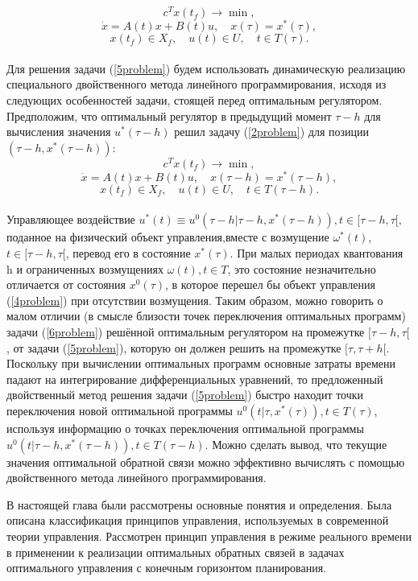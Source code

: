 \begin{equation} \label{5problem}
    c^Tx(t_f)\to \min,
    \end{equation}
$$
    \dot{x}=A(t)x+B(t)u,\quad x(\tau) = x^*(\tau),
    $$
$$
    x(t_f) \in X_f,\quad  u(t)\in U, \quad  t\in T(\tau).
    $$
\\
Для решения задачи (\ref{5problem}) будем использовать динамическую реализацию специального двойственного метода линейного программирования, исходя из следующих особенностей задачи, стоящей перед оптимальным регулятором. 
\\
Предположим, что оптимальный регулятор в предыдущий момент $\tau - h$ для вычисления значения $u^*(\tau - h)$ решил задачу (\ref{2problem}) для позиции $(\tau - h, x^*(\tau - h))$:
\begin{equation} \label{6problem}
    c^Tx(t_f)\to \min,
    \end{equation}
$$
    \dot{x}=A(t)x+B(t)u,\quad  x(\tau - h) = x^*(\tau - h),
    $$
$$
    x(t_f) \in X_f,\quad  u(t)\in U, \quad  t\in T(\tau - h).
    $$
\\    
Управляющее воздействие $u^*(t)\equiv u^0(\tau - h|\tau - h, x^*(\tau - h)), t\in[\tau - h,\tau [,$ поданное на физический объект управления,вместе с возмущение $\omega^*(t)$, $t\in [\tau - h, \tau[$, перевод его в состояние $x^*(\tau)$. 
При малых периодах квантования h и ограниченных возмущениях $\omega(t), t \in T $, это состояние незначительно отличается от состояния $x^0(\tau)$, в которое перешел бы объект управления (\ref{4problem}) при отсутствии возмущения.
Таким образом, можно говорить о малом отличии (в смысле близости точек переключения оптимальных программ) задачи (\ref{6problem}) решённой оптимальным регулятором на промежутке $[\tau - h, \tau[$, от задачи (\ref{5problem}), которую он должен решить на промежутке $[\tau, \tau + h[$.
Поскольку при вычислении оптимальных программ основные затраты времени падают на интегрирование дифференциальных уравнений, то предложенный двойственный метод решения задачи (\ref{5problem}) быстро находит точки переключения новой оптимальной программы $u^0(t| \tau, x^*(\tau)), t\in T(\tau)$, используя информацию о точках переключения оптимальной программы $u^0(t|\tau - h, x^*(\tau - h)), t \in T(\tau - h)$. 
Можно сделать вывод, что текущие значения оптимальной обратной связи можно эффективно вычислять с помощью двойственного метода линейного программирования.

В настоящей глава были рассмотрены основные понятия и определения. Была описана классификация принципов управления, используемых в современной теории управления. Рассмотрен принцип управления в режиме реального времени в применении к реализации оптимальных обратных связей в задачах оптимального управления с конечным горизонтом планирования.
\bigskip